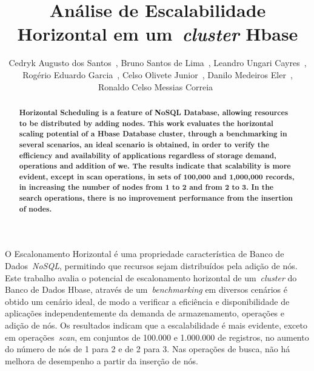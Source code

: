 \documentclass[12pt]{article}
\title{Análise de Escalabilidade Horizontal em um~\emph{cluster}  Hbase}
\author{Cedryk Augusto dos Santos~\inst{1}, Bruno Santos de Lima~\inst{1}, Leandro Ungari Cayres~\inst{1},\\Rogério Eduardo Garcia~\inst{1}, Celso Olivete Junior~\inst{1}, Danilo Medeiros Eler~\inst{1},\\ Ronaldo Celso Messias Correia~\inst{1}}
\begin{document}
 

\maketitle


\begin{abstract}
\textbf{Horizontal Scheduling is a feature of NoSQL Database, allowing resources to be distributed by adding nodes. This work evaluates the horizontal scaling potential of a Hbase Database cluster, through a benchmarking in several scenarios, an ideal scenario is obtained, in order to verify the efficiency and availability of applications regardless of storage demand, operations and addition of we. The results indicate that scalability is more evident, except in scan operations, in sets of 100,000 and 1,000,000 records, in increasing the number of nodes from 1 to 2 and from 2 to 3. In the search operations, there is no improvement performance from the insertion of nodes.}
\end{abstract}
     
\begin{resumo} 
O Escalonamento Horizontal é uma propriedade característica de Banco de Dados~\emph{NoSQL}, permitindo que recursos sejam distribuídos pela adição de nós. Este trabalho avalia o potencial de escalonamento horizontal de um~\emph{cluster} do Banco de Dados Hbase, através de um~\emph{benchmarking} em diversos cenários é obtido um cenário ideal, de modo a verificar a eficiência e disponibilidade de aplicações independentemente da demanda de armazenamento, operações e adição de nós. Os resultados indicam que a escalabilidade é mais evidente, exceto em operações~\emph{scan}, em conjuntos de 100.000 e 1.000.000 de registros, no aumento do número de nós de 1 para 2 e de 2 para 3. Nas operações de busca, não há melhora de desempenho a partir da inserção de nós.

\end{resumo}
\end{document}
